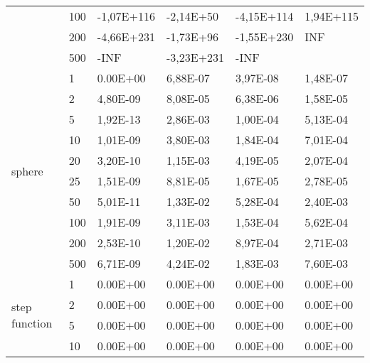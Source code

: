 \begin{longtable}[c]{|m{3.5cm}|l|l|l|l|l|}
                                        & 100       & -1,07E+116 & -2,14E+50  & -4,15E+114 & 1,94E+115 \\ \cline{2-6} 
                                        & 200       & -4,66E+231 & -1,73E+96  & -1,55E+230 & INF       \\ \cline{2-6} 
                                        & 500       & -INF       & -3,23E+231 & -INF       &           \\ \hline
\multirow{10}{*}{sphere}                & 1         & 0.00E+00   & 6,88E-07   & 3,97E-08   & 1,48E-07  \\ \cline{2-6} 
                                        & 2         & 4,80E-09   & 8,08E-05   & 6,38E-06   & 1,58E-05  \\ \cline{2-6} 
                                        & 5         & 1,92E-13   & 2,86E-03   & 1,00E-04   & 5,13E-04  \\ \cline{2-6} 
                                        & 10        & 1,01E-09   & 3,80E-03   & 1,84E-04   & 7,01E-04  \\ \cline{2-6} 
                                        & 20        & 3,20E-10   & 1,15E-03   & 4,19E-05   & 2,07E-04  \\ \cline{2-6} 
                                        & 25        & 1,51E-09   & 8,81E-05   & 1,67E-05   & 2,78E-05  \\ \cline{2-6} 
                                        & 50        & 5,01E-11   & 1,33E-02   & 5,28E-04   & 2,40E-03  \\ \cline{2-6} 
                                        & 100       & 1,91E-09   & 3,11E-03   & 1,53E-04   & 5,62E-04  \\ \cline{2-6} 
                                        & 200       & 2,53E-10   & 1,20E-02   & 8,97E-04   & 2,71E-03  \\ \cline{2-6} 
                                        & 500       & 6,71E-09   & 4,24E-02   & 1,83E-03   & 7,60E-03  \\ \hline
\multirow{10}{*}{step function}         & 1         & 0.00E+00   & 0.00E+00   & 0.00E+00   & 0.00E+00  \\ \cline{2-6} 
                                        & 2         & 0.00E+00   & 0.00E+00   & 0.00E+00   & 0.00E+00  \\ \cline{2-6} 
                                        & 5         & 0.00E+00   & 0.00E+00   & 0.00E+00   & 0.00E+00  \\ \cline{2-6} 
                                        & 10        & 0.00E+00   & 0.00E+00   & 0.00E+00   & 0.00E+00  \\ \cline{2-6} 

\end{longtable}
